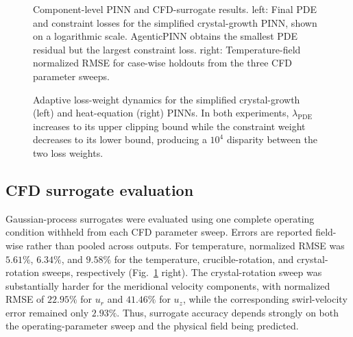 \documentclass{article}
\begin{document}

\begin{figure}[t]
    \centering
    
    \caption{Component-level PINN and CFD-surrogate results. left: Final PDE and constraint losses for the simplified crystal-growth PINN, shown on a logarithmic scale. AgenticPINN obtains the smallest PDE residual but the largest constraint loss. right: Temperature-field normalized RMSE for case-wise holdouts from the three CFD parameter sweeps.}
    \label{fig:results_overview}
\end{figure}

\begin{figure}[t]
    \centering
    
    \caption{Adaptive loss-weight dynamics for the simplified crystal-growth (left) and heat-equation (right) PINNs. In both experiments, $\lambda_{\mathrm{PDE}}$ increases to its upper clipping bound while the constraint weight decreases to its lower bound, producing a $10^4$ disparity between the two loss weights.}
    \label{fig:controller_dynamics}
\end{figure}


\subsection{CFD surrogate evaluation} 
Gaussian-process surrogates were evaluated using one complete operating condition withheld from each CFD parameter sweep. Errors are reported field-wise rather than pooled across outputs. For temperature, normalized RMSE was $5.61\%$, $6.34\%$, and $9.58\%$ for the temperature, crucible-rotation, and crystal-rotation sweeps, respectively (Fig.~\ref{fig:results_overview} right). The crystal-rotation sweep was substantially harder for the meridional velocity components, with normalized RMSE of $22.95\%$ for $u_r$ and $41.46\%$ for $u_z$, while the corresponding swirl-velocity error remained only $2.93\%$. Thus, surrogate accuracy depends strongly on both the operating-parameter sweep and the physical field being predicted.
\end{document}
